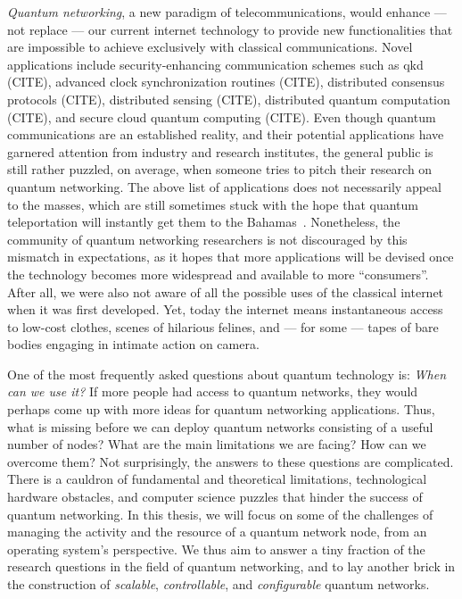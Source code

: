 \begin{refsection}
\emph{Quantum networking}, a new paradigm of telecommunications, would enhance --- not replace ---
our current internet technology to provide new functionalities that are impossible to achieve
exclusively with classical communications. Novel applications include security-enhancing
communication schemes such as \acrfull{qkd} (CITE), advanced clock synchronization routines (CITE),
distributed consensus protocols (CITE), distributed sensing (CITE), distributed quantum computation
(CITE), and secure cloud quantum computing (CITE). Even though quantum communications are an
established reality, and their potential applications have garnered attention from industry and
research institutes, the general public is still rather puzzled, on average, when someone tries to
pitch their research on quantum networking. The above list of applications does not necessarily
appeal to the masses, which are still sometimes stuck with the hope that quantum teleportation will
instantly get them to the Bahamas~\cite{xkcd_teleportation}. Nonetheless, the community of quantum
networking researchers is not discouraged by this mismatch in expectations, as it hopes that more
applications will be devised once the technology becomes more widespread and available to more
``consumers''. After all, we were also not aware of all the possible uses of the classical internet
when it was first developed. Yet, today the internet means instantaneous access to low-cost clothes,
scenes of hilarious felines, and --- for some --- tapes of bare bodies engaging in intimate action
on camera.

One of the most frequently asked questions about quantum technology is: \emph{When can we use it?}
If more people had access to quantum networks, they would perhaps come up with more ideas for
quantum networking applications. Thus, what is missing before we can deploy quantum networks
consisting of a useful number of nodes? What are the main limitations we are facing? How can we
overcome them? Not surprisingly, the answers to these questions are complicated. There is a cauldron
of fundamental and theoretical limitations, technological hardware obstacles, and computer science
puzzles that hinder the success of quantum networking. In this thesis, we will focus on some of the
challenges of managing the activity and the resource of a quantum network node, from an operating
system's perspective. We thus aim to answer a tiny fraction of the research questions in the field
of quantum networking, and to lay another brick in the construction of \emph{scalable},
\emph{controllable}, and \emph{configurable} quantum networks.


\end{refsection}
